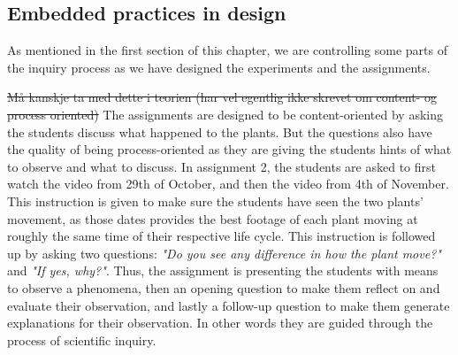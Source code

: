 \subsection{Embedded practices in design}
As mentioned in the first section of this chapter, we are controlling some parts of the inquiry process as we have designed the experiments and the assignments. 

\sout{Må kanskje ta med dette i teorien (har vel egentlig ikke skrevet om content- og process oriented)}
The assignments are designed to be content-oriented by asking the students discuss what happened to the plants. But the questions also have the quality of being process-oriented as they are giving the students hints of what to observe and what to discuss. In assignment 2, the students are asked to first watch the video from 29th of October, and then the video from 4th of November. This instruction is given to make sure the students have seen the two plants' movement, as those dates provides the best footage of each plant moving at roughly the same time of their respective life cycle. This instruction is followed up by asking two questions: \emph{"Do you see any difference in how the plant move?"} and \emph{"If yes, why?"}. Thus, the assignment is presenting the students with means to observe a phenomena, then an opening question to make them reflect on and evaluate their observation, and lastly a follow-up question to make them generate explanations for their observation. In other words they are guided through the process of scientific inquiry. 


